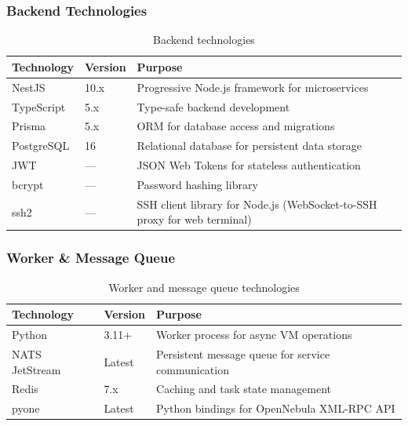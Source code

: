 \subsubsection{Backend Technologies}

\begin{table}[H]
\centering
\caption{Backend technologies}
\label{tab:backend-tech}
\begin{tabularx}{\textwidth}{|l|l|X|}
\hline
\rowcolor{blue!15}
\textbf{Technology} & \textbf{Version} & \textbf{Purpose} \\
\hline
NestJS & 10.x & Progressive Node.js framework for microservices \\
\hline
TypeScript & 5.x & Type-safe backend development \\
\hline
Prisma & 5.x & ORM for database access and migrations \\
\hline
PostgreSQL & 16 & Relational database for persistent data storage \\
\hline
JWT & — & JSON Web Tokens for stateless authentication \\
\hline
bcrypt & — & Password hashing library \\
\hline
ssh2 & — & SSH client library for Node.js (WebSocket-to-SSH proxy for web terminal) \\
\hline
\end{tabularx}
\end{table}

\subsubsection{Worker \& Message Queue}

\begin{table}[H]
\centering
\caption{Worker and message queue technologies}
\label{tab:worker-tech}
\begin{tabularx}{\textwidth}{|l|l|X|}
\hline
\rowcolor{blue!15}
\textbf{Technology} & \textbf{Version} & \textbf{Purpose} \\
\hline
Python & 3.11+ & Worker process for async VM operations \\
\hline
NATS JetStream & Latest & Persistent message queue for service communication \\
\hline
Redis & 7.x & Caching and task state management \\
\hline
pyone & Latest & Python bindings for OpenNebula XML-RPC API \\
\hline
\end{tabularx}
\end{table}


